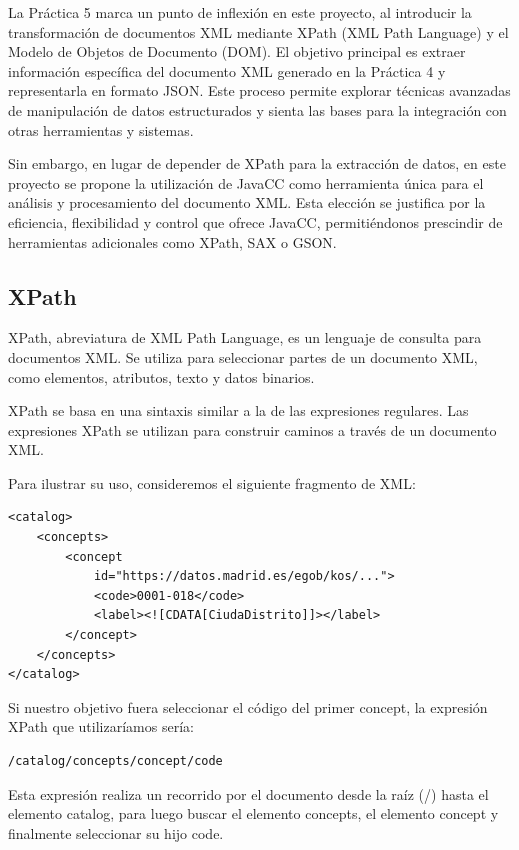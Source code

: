 \noindent La Práctica 5 marca un punto de inflexión en este proyecto, al introducir la transformación de documentos XML mediante XPath (XML Path Language) y el Modelo de Objetos de Documento (DOM). El objetivo principal es extraer información específica del documento XML generado en la Práctica 4 y representarla en formato JSON. Este proceso permite explorar técnicas avanzadas de manipulación de datos estructurados y sienta las bases para la integración con otras herramientas y sistemas.

Sin embargo, en lugar de depender de XPath para la extracción de datos, en este proyecto se propone la utilización de JavaCC como herramienta única para el análisis y procesamiento del documento XML. Esta elección se justifica por la eficiencia, flexibilidad y control que ofrece JavaCC, permitiéndonos prescindir de herramientas adicionales como XPath, SAX o GSON.

\subsection{XPath}

XPath, abreviatura de XML Path Language, es un lenguaje de consulta para documentos XML. Se utiliza para seleccionar partes de un documento XML, como elementos, atributos, texto y datos binarios.

XPath se basa en una sintaxis similar a la de las expresiones regulares. Las expresiones XPath se utilizan para construir caminos a través de un documento XML.

Para ilustrar su uso, consideremos el siguiente fragmento de XML:

\lstset{inputencoding=utf8/latin1}
\begin{lstlisting}
<catalog>
    <concepts>
        <concept
            id="https://datos.madrid.es/egob/kos/...">
            <code>0001-018</code>
            <label><![CDATA[CiudaDistrito]]></label>
        </concept>
    </concepts>
</catalog>

\end{lstlisting}

Si nuestro objetivo fuera seleccionar el código del primer concept, la expresión XPath que utilizaríamos sería:

\lstset{inputencoding=utf8/latin1}
\begin{lstlisting}
/catalog/concepts/concept/code
\end{lstlisting}

Esta expresión realiza un recorrido por el documento desde la raíz (/) hasta el elemento catalog, para luego buscar el elemento concepts, el elemento concept y finalmente seleccionar su hijo code.

